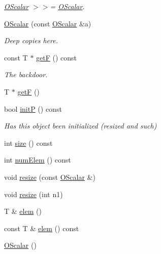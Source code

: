 \begin{DoxyCompactItemize}
\begin{DoxyCompactList}\small\item\em \mbox{\hyperlink{classENSEM_1_1OScalar}{O\+Scalar}} $>$$>$= \mbox{\hyperlink{classENSEM_1_1OScalar}{O\+Scalar}}. \end{DoxyCompactList}\item 
\mbox{\hyperlink{classENSEM_1_1OScalar_a4e394f0291247b014b9b75354e79ae6a}{O\+Scalar}} (const \mbox{\hyperlink{classENSEM_1_1OScalar}{O\+Scalar}} \&a)
\begin{DoxyCompactList}\small\item\em Deep copies here. \end{DoxyCompactList}\item 
const T $\ast$ \mbox{\hyperlink{classENSEM_1_1OScalar_a8e87e97e45239d934b0d141dcf9b92d7}{getF}} () const
\begin{DoxyCompactList}\small\item\em The backdoor. \end{DoxyCompactList}\item 
T $\ast$ \mbox{\hyperlink{classENSEM_1_1OScalar_a040999918115f255a411fd96ad87663f}{getF}} ()
\item 
bool \mbox{\hyperlink{classENSEM_1_1OScalar_a2de94d9cb377fa4ca961d0a8906a76b6}{initP}} () const
\begin{DoxyCompactList}\small\item\em Has this object been initialized (resized and such) \end{DoxyCompactList}\item 
int \mbox{\hyperlink{classENSEM_1_1OScalar_a2029adc2feeab03e85a091ab6878fc2d}{size}} () const
\item 
int \mbox{\hyperlink{classENSEM_1_1OScalar_aa9a7a2cddc34ba1add28369a764ced80}{num\+Elem}} () const
\item 
void \mbox{\hyperlink{classENSEM_1_1OScalar_ab7d5b96a7f1a3451bedd04eda3169c84}{resize}} (const \mbox{\hyperlink{classENSEM_1_1OScalar}{O\+Scalar}} \&)
\item 
void \mbox{\hyperlink{classENSEM_1_1OScalar_ab8b1ad6566b12cb3036794b47bb0ae8d}{resize}} (int n1)
\item 
T \& \mbox{\hyperlink{classENSEM_1_1OScalar_af07cc94eb09bfc29991d8fdc30727574}{elem}} ()
\item 
const T \& \mbox{\hyperlink{classENSEM_1_1OScalar_af797ae7d3763acab7b024aa159b3a7b8}{elem}} () const
\item 
\mbox{\hyperlink{classENSEM_1_1OScalar_abd51915d3c7af4b8ea33923eee128c2c}{O\+Scalar}} ()
\item 

\end{DoxyCompactItemize}

